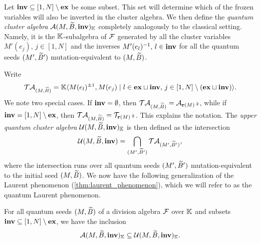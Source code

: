 Let $\mathbf{inv} \subseteq [1, N]\setminus \mathbf{ex}$ be some subset. This set will determine which
of the frozen variables will also be inverted in the cluster algebra. We then define
the \emph{quantum cluster algebra} $\mathcal{A}(M, \widetilde{B},
	\mathbf{inv})_{\mathbb{K}}$ completely analogously to the classical setting. Namely, it is the
$\mathbb{K}$-subalgebra of $\mathcal{F}$ generated by all the cluster variables $M'(e_j), \, j \in
	[1, N]$ and the inverses $M'(e_l)^{-1}, \, l \in \mathbf{inv}$ for all the quantum seeds $(M',
	\widetilde{B}')$ mutation-equivalent to $(M, \widetilde{B})$.

Write
\begin{equation*}
	\mathcal{T}\mathcal{A}_{(M, \widetilde{B})} = \mathbb{K}\langle M(e_l)^{\pm 1}, M(e_j) \mid l \in \mathbf{ex} \sqcup \mathbf{inv},\, j \in [1, N] \setminus (\mathbf{ex} \sqcup \mathbf{inv})\rangle.
\end{equation*}
%
We note two special cases. If $\mathbf{inv} = \emptyset$, then $\mathcal{T}\mathcal{A}_{(M, \widetilde{B})} =
	\mathcal{A}_{\mathbf{r}(M)^{\cdot 2}}$, while if $\mathbf{inv} = [1, N] \setminus \mathbf{ex}$, then $\mathcal{T}\mathcal{A}_{(M,
		\widetilde{B})} = \mathcal{T}_{\mathbf{r}(M)^{\cdot 2}}$. This explains the notation. The \emph{upper quantum
	cluster algebra} $\mathcal{U}(M, \widetilde{B}, \mathbf{inv})_{\mathbb{K}}$ is
then defined as the intersection
\begin{equation*}
	\mathcal{U}(M, \widetilde{B}, \mathbf{inv}) = \bigcap_{(M', \widetilde{B}')} \mathcal{T}\mathcal{A}_{(M', \widetilde{B}')} ,
\end{equation*}
%
where the intersection runs over all quantum seeds $(M', \widetilde{B}')$ mutation-equivalent to
the initial seed $(M, \widetilde{B})$. We now have the following generalization of the Laurent
phenomenon (\cref{thm:laurent_phenomenon}), which we will refer to as the quantum
Laurent phenomenon.
\begin{theorem}\label{thm:quantum_laurent}

	For all quantum seeds $(M, \widetilde{B})$ of a division algebra $\mathcal{F}$ over $\mathbb{K}$ and subsets
	$\mathbf{inv} \subseteq [1, N] \setminus \mathbf{ex}$, we have the inclusion
	\begin{equation*}
		\mathcal{A}(M, \widetilde{B}, \mathbf{inv})_{\mathbb{K}} \subseteq \mathcal{U}(M, \widetilde{B}, \mathbf{inv})_{\mathbb{K}}.
	\end{equation*}
\end{theorem}

